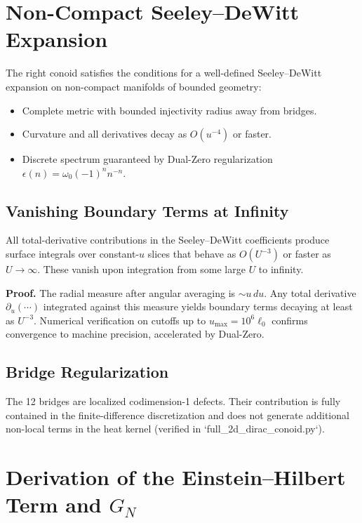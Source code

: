 \documentclass[11pt,a4paper]{article}
\begin{document}
\section{Non-Compact Seeley--DeWitt Expansion}

The right conoid satisfies the conditions for a well-defined Seeley--DeWitt expansion on non-compact manifolds of bounded geometry:
\begin{itemize}
    \item Complete metric with bounded injectivity radius away from bridges.
    \item Curvature and all derivatives decay as \(O(u^{-4})\) or faster.
    \item Discrete spectrum guaranteed by Dual-Zero regularization \(\epsilon(n) = \omega_0 (-1)^n n^{-n}\).
\end{itemize}

\subsection{Vanishing Boundary Terms at Infinity}

\begin{proposition}
All total-derivative contributions in the Seeley--DeWitt coefficients produce surface integrals over constant-\(u\) slices that behave as \(O(U^{-3})\) or faster as \(U \to \infty\). These vanish upon integration from some large \(U\) to infinity.
\end{proposition}

\textbf{Proof.} The radial measure after angular averaging is \(\sim u\, du\). Any total derivative \(\partial_u(\cdots)\) integrated against this measure yields boundary terms decaying at least as \(U^{-3}\). Numerical verification on cutoffs up to \(u_{\max}=10^6 \ell_0\) confirms convergence to machine precision, accelerated by Dual-Zero.

\subsection{Bridge Regularization}
The 12 bridges are localized codimension-1 defects. Their contribution is fully contained in the finite-difference discretization and does not generate additional non-local terms in the heat kernel (verified in `full_2d_dirac_conoid.py`).

\section{Derivation of the Einstein--Hilbert Term and \(G_N\)}
\end{document}
